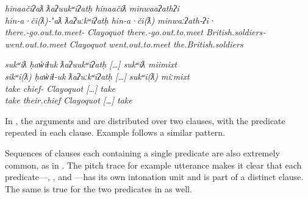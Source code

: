 \begin{exe}

  \ex\label{ex:3.10}

  \begin{xlist}

    \renewcommand{\eachwordfour}{\rule[-10pt]{0pt}{0pt}\rmfamily}

    \ex\label{ex:3.10a}
    \gllll \em{hinaačiʔaƛ}                            ƛaʔuukʷiʔatḥ \em{hinaačiƛ}                      minwaaʔathʔi\\
           \em{hin‑a·či(ƛ)‑ʼaƛ}                        ƛaʔuːkʷiʔatḥ \em{hin‑a·či(ƛ)}                   minwaːʔath‑ʔi·\\
           \em{there.‑go.out.to.meet‑} Clayoquot    \em{there.‑go.out.to.meet} British.soldiers‑\\
           \em{went.out.to.meet}                      Clayoquot    \em{went.out.to.meet}              the.British.soldiers\\

    \ex\label{ex:3.10b}
    \gllll \em{sukʷiƛ}   ḥaw̓iɬuk         ƛaʔuukʷiʔatḥ […] \em{sukʷiƛ}   miimixt\\
           \em{sikʷi(ƛ)} ḥaw̓iɬ‑uk        ƛaʔuːkʷiʔatḥ […] \em{sukʷi(ƛ)} miːmixt\\
           \em{take}     chief‑ Clayoquot    […] \em{take}     \\
           \em{take}     their.chief     Clayoquot    […] \em{take}     \\

    \renewcommand{\eachwordfour}{\rmfamily}

  \end{xlist}

\end{exe}

\noindent In , the arguments   and   are distributed over two clauses, with the predicate  repeated in each clause. Example  follows a similar pattern.

Sequences of clauses each containing a single predicate are also extremely common, as in . The pitch trace for example  utterance makes it clear that each predicate—, , and —has its own intonation unit and is part of a distinct clause. The same is true for the two predicates in  as well.

